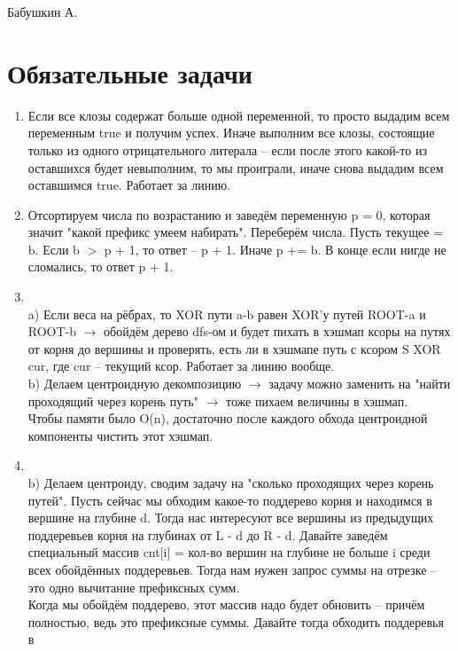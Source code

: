 \documentclass[12pt]{article}
\begin{document}
\def\t{\texttt}

Бабушкин А.

\section{Обязательные задачи}

\begin{enumerate}
    \setlength{\parskip}{0pt} 
    \setlength{\itemsep}{0pt} 
    \item Если все клозы содержат больше одной переменной, то просто выдадим всем переменным true и получим успех. Иначе выполним все клозы, 
    состоящие только из одного отрицательного литерала -- если после этого какой-то из оставшихся будет невыполним, то мы проиграли, иначе 
    снова выдадим всем оставшимся true. Работает за линию. \\
    \item Отсортируем числа по возрастанию и заведём переменную p = 0, которая значит "какой префикс умеем набирать". Переберём числа. Пусть 
    текущее = b. Если b $>$ p + 1, то ответ -- p + 1. Иначе p += b. В конце если нигде не сломались, то ответ p + 1.\\
    \item ~\\
    a) Если веса на рёбрах, то XOR пути a-b равен XOR'у путей ROOT-a и ROOT-b $\to$ обойдём дерево dfs-ом и будет пихать в хэшмап ксоры на путях 
    от корня до вершины и проверять, есть ли в хэшмапе путь с ксором S XOR cur, где cur -- текущий ксор. Работает за линию вообще. \\
    b) Делаем центроидную декомпозицию $\to$ задачу можно заменить на "найти проходящий через корень путь" $\to$ тоже пихаем величины в хэшмап. \\
    Чтобы памяти было O(n), достаточно после каждого обхода центроидной компоненты чистить этот хэшмап. \\
    \item ~\\
    b) Делаем центроиду, сводим задачу на "сколько проходящих через корень путей". Пусть сейчас мы обходим какое-то поддерево корня и находимся в 
    вершине на глубине d. Тогда нас интересуют все вершины из предыдущих поддеревьев корня на глубинах от L - d до R - d. Давайте заведём специальный 
    массив cnt[i] = кол-во вершин на глубине не больше i среди всех обойдённых поддеревьев. Тогда нам нужен запрос суммы на отрезке -- это одно вычитание 
    префиксных сумм. \\
    Когда мы обойдём поддерево, этот массив надо будет обновить -- причём полностью, ведь это префиксные суммы. Давайте тогда обходить поддеревья в 

\end{enumerate}
\end{document}
